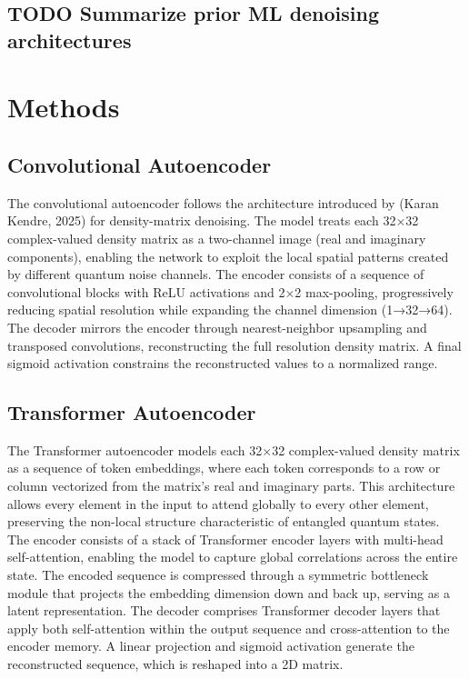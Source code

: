 \documentclass[11pt]{article}
\begin{document}
\subsection{{\bfseries\sffamily TODO} Summarize prior ML denoising architectures}
\label{sec:org8ecc625}
\section{Methods}
\label{sec:org10e4c68}
\subsection{Convolutional Autoencoder}
\label{sec:org31d044b}
The convolutional autoencoder follows the architecture introduced by (Karan Kendre, 2025) for density-matrix denoising. The model treats each 32×32 complex-valued density matrix as a two-channel image (real and imaginary components), enabling the network to exploit the local spatial patterns created by different quantum noise channels. The encoder consists of a sequence of convolutional blocks with ReLU activations and 2×2 max-pooling, progressively reducing spatial resolution while expanding the channel dimension (1→32→64). The decoder mirrors the encoder through nearest-neighbor upsampling and transposed convolutions, reconstructing the full resolution density matrix. A final sigmoid activation constrains the reconstructed values to a normalized range.
\subsection{Transformer Autoencoder}
\label{sec:org6175172}
The Transformer autoencoder models each 32×32 complex-valued density matrix as a sequence of token embeddings, where each token corresponds to a row or column vectorized from the matrix’s real and imaginary parts. This architecture allows every element in the input to attend globally to every other element, preserving the non-local structure characteristic of entangled quantum states. The encoder consists of a stack of Transformer encoder layers with multi-head self-attention, enabling the model to capture global correlations across the entire state. The encoded sequence is compressed through a symmetric bottleneck module that projects the embedding dimension down and back up, serving as a latent representation. The decoder comprises Transformer decoder layers that apply both self-attention within the output sequence and cross-attention to the encoder memory. A linear projection and sigmoid activation generate the reconstructed sequence, which is reshaped into a 2D matrix.
\end{document}
